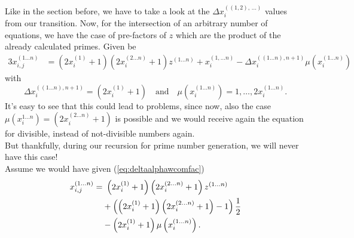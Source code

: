 Like in the section before, we have to take a look at the $\Delta x_{i}^{\left(\left(1,2\right),\, \dots\right)}$ values from our transition. Now, for the intersection of an arbitrary number of equations, we have the case of pre-factors of $z$ which are the product of the already calculated primes. Given be
\begin{alignat}{3}
	x_{i,j}^{\left(1 \dots n\right)} &= \left(2x_{i}^{\left(1\right)} + 1\right)\left(2x_{i}^{\left(2 \dots n\right)} + 1\right)z^{\left(1 \dots n\right)} + x_{i}^{\left(1, \dots n\right)} - \Delta x_{i}^{\left(\left(1 \dots n\right),n+1\right)}\mu\left(x_{i}^{\left(1 \dots n\right)}\right) \label{eq:arbnumeqdeltaxtrans}
\end{alignat}
with
\begin{equation}
	\Delta x_{i}^{\left(\left(1 \dots n\right),n + 1\right)} = \left(2x_{i}^{\left(1\right)} + 1\right) \quad \mathrm{and} \quad \mu\left(x_{i}^{\left(1 \dots n\right)}\right) = 1, \dots, 2x_{i}^{\left(1 \dots n\right)}.
\label{eq:deltaalphawcomfac}
\end{equation}
It's easy to see that this could lead to problems, since now, also the case $\mu\left(x_{i}^{1 \dots n}\right) = \left(2x_{i}^{\left(2 \dots n\right)} + 1\right)$ is possible and we would receive again the equation for divisible, instead of not-divisible numbers again.\\

But thankfully, during our recursion for prime number generation, we will never have this case!\\

Assume we would have given (\ref{eq:deltaalphawcomfac})
\begin{alignat}{3}
	x_{i,j}^{\left(1 \dots n\right)} =& \ \left(2x_{i}^{\left(1\right)} + 1\right)\left(2x_{i}^{\left(2 \dots n\right)} + 1\right)z^{\left(1 \dots n\right)} \notag \\
	&+ \left(\left(2x_{i}^{\left(1\right)} + 1\right)\left(2x_{i}^{\left(2 \dots n\right)} + 1\right) - 1\right)\frac{1}{2} \notag \\
	& - \left(2x_{i}^{\left(1\right)} + 1\right)\mu\left(x_{i}^{\left(1 \dots n\right)}\right). \label{eq:deltafactorsense1}
\end{alignat}

